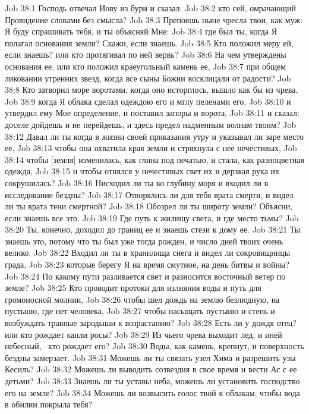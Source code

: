 Job 38:1  Господь отвечал Иову из бури и сказал:
Job 38:2  кто сей, омрачающий Провидение словами без смысла?
Job 38:3  Препояшь ныне чресла твои, как муж: Я буду спрашивать тебя, и ты объясняй Мне:
Job 38:4  где был ты, когда Я полагал основания земли? Скажи, если знаешь.
Job 38:5  Кто положил меру ей, если знаешь? или кто протягивал по ней вервь?
Job 38:6  На чем утверждены основания ее, или кто положил краеугольный камень ее,
Job 38:7  при общем ликовании утренних звезд, когда все сыны Божии восклицали от радости?
Job 38:8  Кто затворил море воротами, когда оно исторглось, вышло как бы из чрева,
Job 38:9  когда Я облака сделал одеждою его и мглу пеленами его,
Job 38:10  и утвердил ему Мое определение, и поставил запоры и ворота,
Job 38:11  и сказал: доселе дойдешь и не перейдешь, и здесь предел надменным волнам твоим?
Job 38:12  Давал ли ты когда в жизни своей приказания утру и указывал ли заре место ее,
Job 38:13  чтобы она охватила края земли и стряхнула с нее нечестивых,
Job 38:14  чтобы [земля] изменилась, как глина под печатью, и стала, как разноцветная одежда,
Job 38:15  и чтобы отнялся у нечестивых свет их и дерзкая рука их сокрушилась?
Job 38:16  Нисходил ли ты во глубину моря и входил ли в исследование бездны?
Job 38:17  Отворялись ли для тебя врата смерти, и видел ли ты врата тени смертной?
Job 38:18  Обозрел ли ты широту земли? Объясни, если знаешь все это.
Job 38:19  Где путь к жилищу света, и где место тьмы?
Job 38:20  Ты, конечно, доходил до границ ее и знаешь стези к дому ее.
Job 38:21  Ты знаешь это, потому что ты был уже тогда рожден, и число дней твоих очень велико.
Job 38:22  Входил ли ты в хранилища снега и видел ли сокровищницы града,
Job 38:23  которые берегу Я на время смутное, на день битвы и войны?
Job 38:24  По какому пути разливается свет и разносится восточный ветер по земле?
Job 38:25  Кто проводит протоки для излияния воды и путь для громоносной молнии,
Job 38:26  чтобы шел дождь на землю безлюдную, на пустыню, где нет человека,
Job 38:27  чтобы насыщать пустыню и степь и возбуждать травные зародыши к возрастанию?
Job 38:28  Есть ли у дождя отец? или кто рождает капли росы?
Job 38:29  Из чьего чрева выходит лед, и иней небесный, --кто рождает его?
Job 38:30  Воды, как камень, крепнут, и поверхность бездны замерзает.
Job 38:31  Можешь ли ты связать узел Хима и разрешить узы Кесиль?
Job 38:32  Можешь ли выводить созвездия в свое время и вести Ас с ее детьми?
Job 38:33  Знаешь ли ты уставы неба, можешь ли установить господство его на земле?
Job 38:34  Можешь ли возвысить голос твой к облакам, чтобы вода в обилии покрыла тебя?
